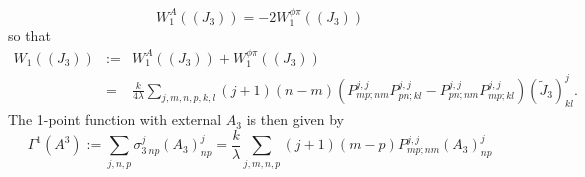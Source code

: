 \documentclass[11pt]{book}
\theoremstyle{break}
\begin{document}
\begin{equation}
W^{A}_1((J_3))=-2W^{\phi\pi}_1((J_3))\label{gaugevsghost}
\end{equation}
so that
\begin{eqnarray}
W_1((J_3))&:=&W^{A}_1((J_3))+W^{\phi\pi}_1((J_3))\\
&=&\frac{k}{4 \lambda}\sum_{j,m,n,p,k,l}(j+1) (n-m)(P^{j,j}_{mp;nm}P^{j,j}_{pn;kl}-P^{j,j}_{pn;nm}P^{j,j}_{mp;kl})(\widetilde J_3)^j_{kl} \label{w1-gauge}.
\end{eqnarray}
The 1-point function with external $A_3$ is then given by
\begin{equation}
\Gamma^{1}(A^3):=\sum_{j,n,p}\sigma^{j}_{3\ np}(A_3)^j_{np}=\frac{k}{ \lambda}\sum_{j,m,n,p}(j+1)(m-p)P^{j,j}_{mp;nm}(A_3)^j_{np}\label{effectgamma1} 
\end{equation}
\end{document}
